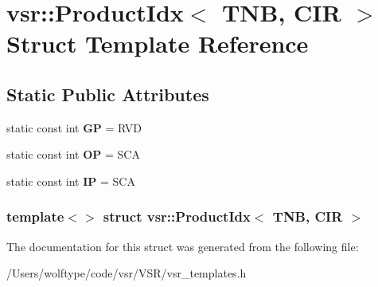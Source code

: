 \hypertarget{structvsr_1_1_product_idx_3_01_t_n_b_00_01_c_i_r_01_4}{\section{vsr\-:\-:Product\-Idx$<$ T\-N\-B, C\-I\-R $>$ Struct Template Reference}
\label{structvsr_1_1_product_idx_3_01_t_n_b_00_01_c_i_r_01_4}
}
\subsection*{Static Public Attributes}
\begin{DoxyCompactItemize}
\item 
\hypertarget{structvsr_1_1_product_idx_3_01_t_n_b_00_01_c_i_r_01_4_ae4e43a465eb6f1d13165824192074711}{static const int {\bfseries G\-P} = R\-V\-D}\label{structvsr_1_1_product_idx_3_01_t_n_b_00_01_c_i_r_01_4_ae4e43a465eb6f1d13165824192074711}

\item 
\hypertarget{structvsr_1_1_product_idx_3_01_t_n_b_00_01_c_i_r_01_4_a82e0935e59a375ae3c5075c1be77584c}{static const int {\bfseries O\-P} = S\-C\-A}\label{structvsr_1_1_product_idx_3_01_t_n_b_00_01_c_i_r_01_4_a82e0935e59a375ae3c5075c1be77584c}

\item 
\hypertarget{structvsr_1_1_product_idx_3_01_t_n_b_00_01_c_i_r_01_4_a24b3d46b987851bd4880bf8b6f99017c}{static const int {\bfseries I\-P} = S\-C\-A}\label{structvsr_1_1_product_idx_3_01_t_n_b_00_01_c_i_r_01_4_a24b3d46b987851bd4880bf8b6f99017c}

\end{DoxyCompactItemize}
\subsubsection*{template$<$$>$ struct vsr\-::\-Product\-Idx$<$ T\-N\-B, C\-I\-R $>$}



The documentation for this struct was generated from the following file\-:\begin{DoxyCompactItemize}
\item 
/\-Users/wolftype/code/vsr/\-V\-S\-R/vsr\-\_\-templates.\-h\end{DoxyCompactItemize}
